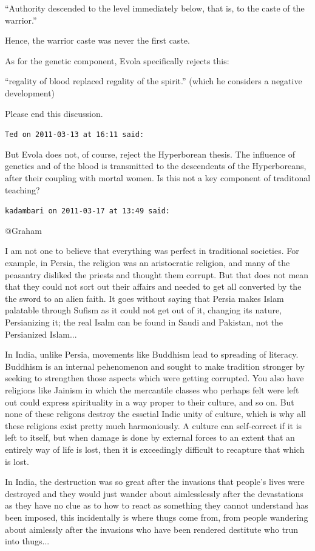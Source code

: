 \begin{footnotesize}
\begin{sffamily}
``Authority descended to the level immediately below, that is, to the caste of the warrior.''

Hence, the warrior caste was never the first caste.

As for the genetic component, Evola specifically rejects this:

``regality of blood replaced regality of the spirit.'' (which he considers a negative development)

Please end this discussion.

\hfill

\texttt{Ted on 2011-03-13 at 16:11 said:}

But Evola does not, of course, reject the Hyperborean thesis. The influence of genetics and of the blood is transmitted to the descendents of the Hyperboreans, after their coupling with mortal women. Is this not a key component of traditonal teaching?

\texttt{kadambari on 2011-03-17 at 13:49 said:}

@Graham

I am not one to believe that everything was perfect in traditional societies. For example, in Persia, the religion was an aristocratic religion, and many of the peasantry disliked the priests and thought them corrupt. But that does not mean that they could not sort out their affairs and needed to get all converted by the the sword to an alien faith. It goes without saying that Persia makes Islam palatable through Sufism as it could not get out of it, changing its nature, Persianizing it; the real Isalm can be found in Saudi and Pakistan, not the Persianized Islam... 

In India, unlike Persia, movements like Buddhism lead to spreading of literacy. Buddhism is an internal pehenomenon and sought to make tradition stronger by seeking to strengthen those aspects which were getting corrupted. You also have religions like Jainism in which the mercantile classes who perhaps felt were left out could express spirituality in a way proper to their culture, and so on. But none of these religons destroy the essetial Indic unity of culture, which is why all these religions exist pretty much harmoniously. A culture can self-correct if it is left to itself, but when damage is done by external forces to an extent that an entirely way of life is lost, then it is exceedingly difficult to recapture that which is lost.

In India, the destruction was so great after the invasions that people's lives were destroyed and they would just wander about aimlesslessly after the devastations as they have no clue as to how to react as something they cannot understand has been imposed, this incidentally is where thugs come from, from people wandering about aimlessly after the invasions who have been rendered destitute who trun into thugs... 


\end{sffamily}
\end{footnotesize}
